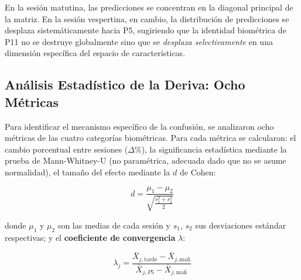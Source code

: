 En la sesión matutina, las predicciones se concentran en la diagonal
principal de la matriz.
En la sesión vespertina, en cambio, la distribución
de predicciones se desplaza sistemáticamente hacia P5, sugiriendo que la
identidad biométrica de P11 no se destruye globalmente sino que se
\textit{desplaza selectivamente} en una dimensión específica del espacio
de características.
\subsection{Análisis Estadístico de la Deriva: Ocho Métricas}
Para identificar el mecanismo específico de la confusión, se analizaron
ocho métricas de las cuatro categorías biométricas.
Para cada métrica
se calcularon: el cambio porcentual entre sesiones ($\Delta\%$), la
significancia estadística mediante la prueba de Mann-Whitney-U
(no paramétrica, adecuada dado que no se asume normalidad), el tamaño
del efecto mediante la $d$ de Cohen:

\begin{equation}
	d = \frac{\mu_1 - \mu_2}{\sqrt{\frac{s_1^2 + s_2^2}{2}}}
	\label{eq:cohen_d}
\end{equation}

\noindent donde $\mu_1$ y $\mu_2$ son las medias de cada sesión y $s_1$, $s_2$
sus desviaciones estándar respectivas;
y el \textbf{coeficiente de convergencia} $\lambda$:

\begin{equation}
	\lambda_j = \frac{\bar{X}_{j,\text{tarde}} - \bar{X}_{j,\text{mañ}}}
	{\bar{X}_{j,P5} - \bar{X}_{j,\text{mañ}}}
	\label{eq:lambda_convergencia}
\end{equation}

